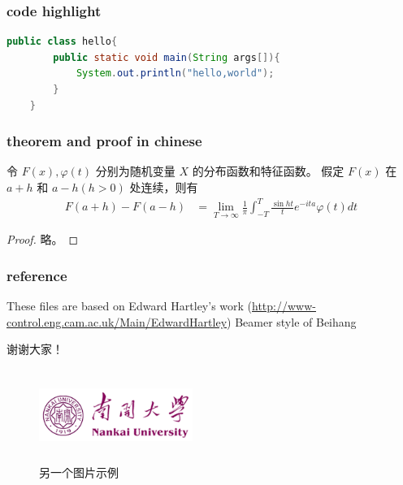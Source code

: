 \documentclass[UTF8]{beamer}
\begin{document}
\begin{frame}[fragile]
    \frametitle{code highlight}
    \begin{lstlisting}[language=java]
    public class hello{
        public static void main(String args[]){
            System.out.println("hello,world");
        }
    }
    \end{lstlisting}
\end{frame}

\begin{frame}
    \frametitle{theorem and proof in chinese}
    \begin{theorem}[L\'{e}vy\index{L\'{e}vy 定理}]
    令 $F(x),\varphi(t)$ 分别为随机变量 $X$ 的分布函数和特征函数。
    假定 $F(x)$ 在 $a+h$ 和 $a-h (h>0)$ 处连续，则有
    \begin{align}
    \label{Levy theorem}  %
    F(a+h)-F(a-h)&=\lim_{T\rightarrow\infty}\frac{1}{\pi}\int^{T}_{-T}\frac{\sin ht}{t}
    e^{-ita}\varphi(t)dt
    \end{align}
    \end{theorem}
    \begin{proof}
        略。
    \end{proof}
\end{frame}

\begin{frame}
    \frametitle{reference}
    \begin{thebibliography}{99} 
     These files are based on Edward Hartley's work
        (\url{http://www-control.eng.cam.ac.uk/Main/EdwardHartley})
     Beamer style of Beihang
    \end{thebibliography}
\end{frame}

\begin{frame}
    \Huge{谢谢大家！}\\
    \begin{figure}[htb]
	\includegraphics[width=5cm,height=3cm]{nk_logo.png}
	\caption{另一个图片示例}
	\label{fig2}
    \end{figure}
\end{frame}
\end{document}
